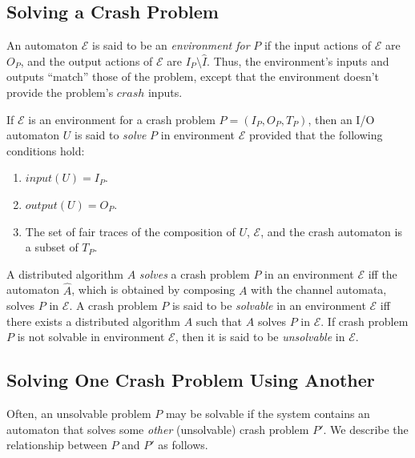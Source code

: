 \documentclass[11pt]{article}
\numberwithin{theorem}{section}
\begin{document}
\subsection{Solving a Crash Problem}
\label{subsec:solvingCrashProblems}

An automaton $\mathcal{E}$ is said to be an \emph{environment for} $P$
if the input actions of $\mathcal{E}$ are $O_P$, and the output
actions of $\mathcal{E}$ are $I_P \setminus \hat{I}$.
Thus, the environment's inputs and outputs ``match'' those of the
problem, except that the environment doesn't provide the problem's
$crash$ inputs.

If $\mathcal{E}$ is an environment for a crash problem $P =
(I_P,O_P,T_P)$, then an I/O automaton $U$ is said to \emph{solve} $P$
in environment $\mathcal{E}$ provided that the following conditions
hold:
\begin{enumerate}
\item
$input(U) = I_P$.
\item
$output(U) = O_P$.
\item
The set of fair traces of the composition of $U$, $\mathcal{E}$, and
the crash automaton is a subset of $T_P$.
\end{enumerate}

A distributed algorithm $A$ \emph{solves} a crash problem $P$ in an
environment $\mathcal{E}$ iff the automaton $\hat{A}$, which is
obtained by composing $A$ with the channel automata, solves $P$ in
$\mathcal{E}$. 
A crash problem $P$ is said to be \emph{solvable} in an environment
$\mathcal{E}$ iff there exists a distributed algorithm $A$ such
that $A$ solves $P$ in $\mathcal{E}$. 
If crash problem $P$ is not solvable in environment $\mathcal{E}$, then
it is said to be \emph{unsolvable} in $\mathcal{E}$.

\subsection{Solving One Crash Problem Using Another}

Often, an unsolvable problem $P$ may be solvable if the system
contains an automaton that solves some \emph{other} (unsolvable) crash
problem $P'$. We describe the relationship between $P$ and $P'$ as
follows.
\end{document}
